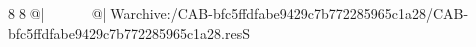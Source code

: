 8  8  @|                                                  @| W   archive:/CAB-bfc5ffdfabe9429c7b772285965c1a28/CAB-bfc5ffdfabe9429c7b772285965c1a28.resS 